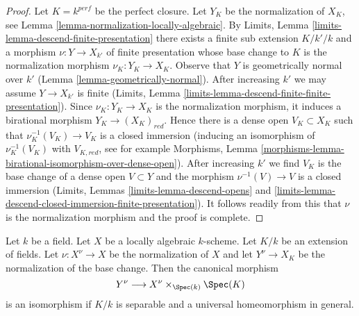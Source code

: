 \begin{proof}
Let $K = k^{perf}$ be the perfect closure. Let $Y_K$ be the
normalization of $X_K$, see Lemma \ref{lemma-normalization-locally-algebraic}.
By Limits, Lemma \ref{limits-lemma-descend-finite-presentation}
there exists a finite sub extension $K/k'/k$ and a morphism
$\nu : Y \to X_{k'}$ of finite presentation whose base change to $K$
is the normalization morphism $\nu_K : Y_K \to X_K$.
Observe that $Y$ is geometrically normal over $k'$
(Lemma \ref{lemma-geometrically-normal}).
After increasing $k'$ we may assume $Y \to X_{k'}$ is finite
(Limits, Lemma \ref{limits-lemma-descend-finite-finite-presentation}).
Since $\nu_K : Y_K \to X_K$ is the normalization morphism,
it induces a birational morphism $Y_K \to (X_K)_{red}$.
Hence there is a dense open $V_K \subset X_K$ such that
$\nu_K^{-1}(V_K) \to V_K$ is a closed immersion
(inducing an isomorphism of $\nu_K^{-1}(V_K)$ with $V_{K, red}$, see
for example Morphisms, Lemma
\ref{morphisms-lemma-birational-isomorphism-over-dense-open}).
After increasing $k'$ we find $V_K$ is the base change of a dense open
$V \subset Y$ and the morphism $\nu^{-1}(V) \to V$ is a closed immersion
(Limits, Lemmas \ref{limits-lemma-descend-opens} and
\ref{limits-lemma-descend-closed-immersion-finite-presentation}).
It follows readily from this that $\nu$ is the normalization
morphism and the proof is complete.
\end{proof}

\begin{lemma}
\label{lemma-normalization-and-change-of-fields}
Let $k$ be a field. Let $X$ be a locally algebraic $k$-scheme.
Let $K/k$ be an extension of fields. Let $\nu : X^\nu \to X$
be the normalization of $X$ and let $Y^\nu \to X_K$ be the
normalization of the base change. Then the canonical morphism
$$
Y^\nu \longrightarrow X^\nu \times_{\Spec(k)} \Spec(K)
$$
is an isomorphism if $K/k$ is separable and a universal homeomorphism
in general.
\end{lemma}

